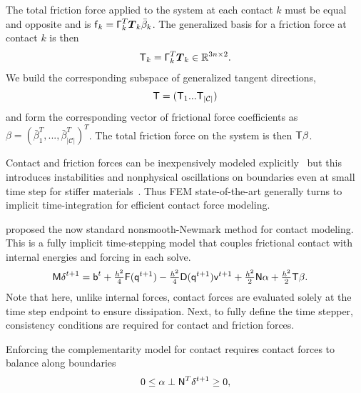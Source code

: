 The total friction force applied to the system at each contact $k$ must be equal and opposite and is $\mbox{\textbf{{$\mathsf f$}}}_k = \mbox{\textbf{{$\mathsf \Gamma$}}}_k^T \mbox{$\bm{T}$}_k \bar{\beta}_k$. 
The generalized basis for a friction force at contact $k$ is then 
\begin{equation}
\mbox{\textbf{{$\mathsf T$}}}_k = \mbox{\textbf{{$\mathsf \Gamma$}}}_k^T \mbox{$\bm{T}$}_k \in \mathbb{R}^{3n \times 2}.
\end{equation}
We build the corresponding subspace of generalized tangent directions,
\begin{equation}
\mbox{\textbf{{$\mathsf T$}}} = ( \mbox{\textbf{{$\mathsf T$}}}_1 ... \mbox{\textbf{{$\mathsf T$}}}_{|\mathcal C|})
\end{equation}
and form the corresponding vector of frictional force coefficients as $\beta = ( \bar{\beta}^T_1,  ... , \bar{\beta}^T_{|\mathcal C|})^T$.
The total friction force on the system is then $\mbox{\textbf{{$\mathsf T$}}} \beta$.

Contact and friction forces can be inexpensively modeled explicitly~\citep{Belytschko:2013tz} but this introduces instabilities and nonphysical oscillations on boundaries even at small time step for stiffer materials~\cite{Deuflhard:2008fu}. Thus FEM state-of-the-art generally turns to implicit time-integration for efficient contact force modeling. 

\citet{Kane:1999kr} proposed the now standard nonsmooth-Newmark method for contact modeling. 
This is a fully implicit time-stepping model that couples frictional contact with internal energies and forcing in each solve.
\begin{align}
\begin{split}
\mbox{\textbf{{$\mathsf M$}}} \mbox{\textbf{{$\mathsf \delta$}}}^{t+1} &= \mbox{\textbf{{$\mathsf b$}}}^t +  \tfrac{h^2}{4} \mbox{\textbf{{$\mathsf F$}}}(\mbox{\textbf{{$\mathsf q$}}}^{t+1}) -\tfrac{h^2}{4} \mbox{\textbf{{$\mathsf D$}}}(\mbox{\textbf{{$\mathsf q$}}}^{t+1}) \mbox{\textbf{{$\mathsf v$}}}^{t+1} + \tfrac{h^2}{2} \mbox{\textbf{{$\mathsf N$}}} \alpha +  \tfrac{h^2}{2}  \mbox{\textbf{{$\mathsf T$}}} \beta.
\label{eq:newmark_contact_implicit}
\end{split}
\end{align}
Note that here, unlike internal forces, contact forces are evaluated solely at the time step endpoint to ensure dissipation.
Next, to fully define the time stepper, consistency conditions are required for contact and friction forces. 

Enforcing the complementarity model for contact requires contact forces to balance along boundaries 
\begin{align}
\begin{split}
0 \leq \alpha \perp \mbox{\textbf{{$\mathsf N$}}}^T \delta^{t+1} \geq 0,
\label{eq:contact_conditions}
\end{split}
\end{align}

